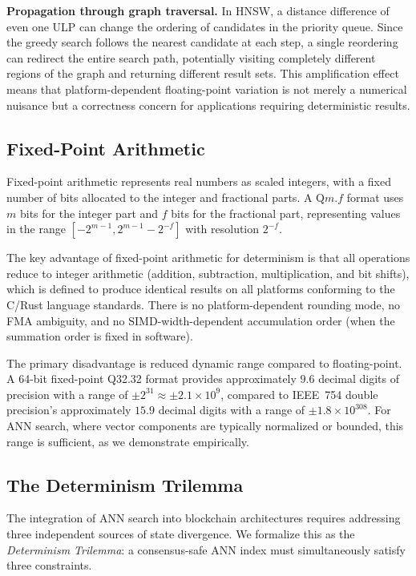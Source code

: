 \documentclass[10pt,journal]{IEEEtran}
\newcommand{\hnsw}{\textsc{HNSW}}
\begin{document}
\textbf{Propagation through graph traversal.} In \hnsw{}, a distance difference of even one ULP can change the ordering of candidates in the priority queue. Since the greedy search follows the nearest candidate at each step, a single reordering can redirect the entire search path, potentially visiting completely different regions of the graph and returning different result sets. This amplification effect means that platform-dependent floating-point variation is not merely a numerical nuisance but a correctness concern for applications requiring deterministic results.

\subsection{Fixed-Point Arithmetic}

Fixed-point arithmetic represents real numbers as scaled integers, with a fixed number of bits allocated to the integer and fractional parts. A Q$m$.$f$ format uses $m$ bits for the integer part and $f$ bits for the fractional part, representing values in the range $[-2^{m-1}, 2^{m-1} - 2^{-f}]$ with resolution $2^{-f}$.

The key advantage of fixed-point arithmetic for determinism is that all operations reduce to integer arithmetic (addition, subtraction, multiplication, and bit shifts), which is defined to produce identical results on all platforms conforming to the C/Rust language standards. There is no platform-dependent rounding mode, no FMA ambiguity, and no SIMD-width-dependent accumulation order (when the summation order is fixed in software).

The primary disadvantage is reduced dynamic range compared to floating-point. A 64-bit fixed-point Q32.32 format provides approximately $9.6$ decimal digits of precision with a range of $\pm 2^{31} \approx \pm 2.1 \times 10^9$, compared to IEEE~754 double precision's approximately $15.9$ decimal digits with a range of $\pm 1.8 \times 10^{308}$. For ANN search, where vector components are typically normalized or bounded, this range is sufficient, as we demonstrate empirically.

\subsection{The Determinism Trilemma}
\label{sec:trilemma}

The integration of ANN search into blockchain architectures requires addressing three independent sources of state divergence. We formalize this as the \emph{Determinism Trilemma}: a consensus-safe ANN index must simultaneously satisfy three constraints.
\end{document}
